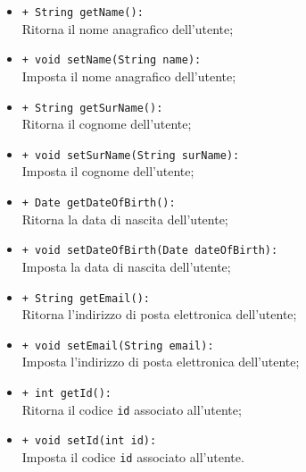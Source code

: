 \begin{flushleft}
\begin{itemize}
\begin{sloppypar}
\begin{itemize}
\item \texttt{+ String getName():}\\ Ritorna il nome anagrafico dell'utente;
\item \texttt{+ void setName(String name):}\\ Imposta il nome anagrafico dell'utente;
\item \texttt{+ String getSurName():}\\ Ritorna il cognome dell'utente;
\item \texttt{+ void setSurName(String surName):}\\ Imposta il cognome dell'utente;
\item \texttt{+ Date getDateOfBirth():}\\ Ritorna la data di nascita dell'utente;
\item \texttt{+ void setDateOfBirth(Date dateOfBirth):}\\ Imposta la data di nascita dell'utente;
\item \texttt{+ String getEmail():}\\ Ritorna l'indirizzo di posta elettronica dell'utente;
\item \texttt{+ void setEmail(String email):}\\ Imposta l'indirizzo di posta elettronica dell'utente;
\item \texttt{+ int getId():}\\ Ritorna il codice \texttt{id} associato all'utente;
\item \texttt{+ void setId(int id):}\\ Imposta il codice \texttt{id} associato all'utente.
\end{itemize}
\end{sloppypar}
\end{itemize}
\end{flushleft}

